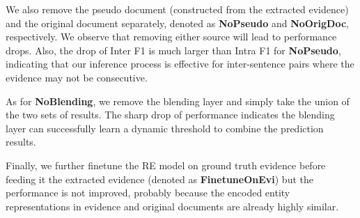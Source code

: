 \begin{table}[!t]
\centering
{}
    \upv
    \caption{Ablation study of \ours on DocRED.}
    \label{tab:ablation}
    \downv
\end{table}

We also remove the pseudo document (constructed from the extracted evidence) and the original document separately, denoted as \textbf{NoPseudo} and \textbf{NoOrigDoc}, respectively.
We observe that removing either source will lead to performance drops. Also, the drop of Inter F1 is much larger than Intra F1 for \textbf{NoPseudo},
indicating that our inference process is effective for inter-sentence pairs where the evidence may not be consecutive.

As for \textbf{NoBlending}, we remove the blending layer and simply take the union of the two sets of results.
The sharp drop of performance indicates
the blending layer can successfully learn a dynamic threshold to combine the prediction results.

Finally, we further finetune the RE model on ground truth evidence before feeding it the extracted evidence (denoted as \textbf{FinetuneOnEvi}) but the performance is not improved, probably because the encoded entity representations in evidence and original documents are already highly similar.


